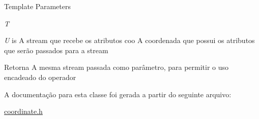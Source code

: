 \begin{DoxyTemplParams}{Template Parameters}
\item[{\em T}]\item[{\em U}]is A stream que recebe os atributos  coo A coordenada que possui os atributos que serão passados para a stream\end{DoxyTemplParams}
\begin{DoxyReturn}{Retorna}
A mesma stream passada como parâmetro, para permitir o uso encadeado do operador 
\end{DoxyReturn}


A documentação para esta classe foi gerada a partir do seguinte arquivo:\begin{DoxyCompactItemize}
\item 
\hyperlink{coordinate_8h}{coordinate.h}\end{DoxyCompactItemize}
